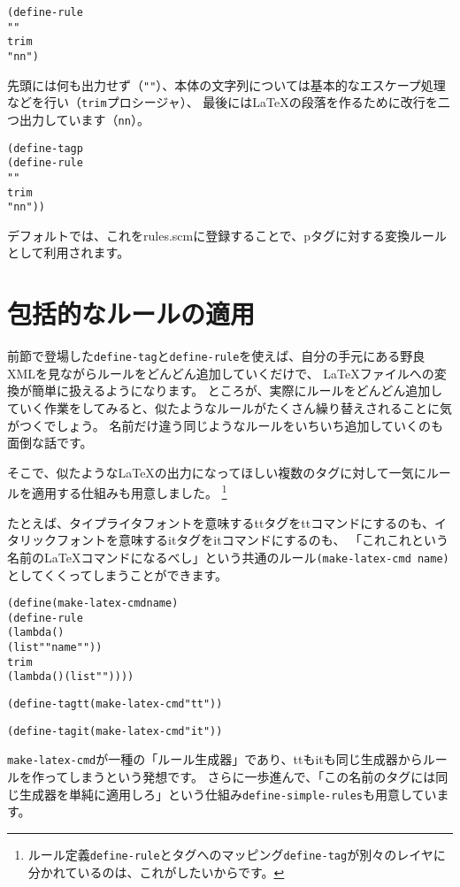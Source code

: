 \documentclass{jsbook}
\begin{document}
\begin{alltt}
(define-rule
  ""
  trim
  "{}n{}n")
\end{alltt}
先頭には何も出力せず（\texttt{""}）、本体の文字列については基本的なエスケープ処理などを行い（\texttt{trim}プロシージャ）、
最後にはLaTeXの段落を作るために改行を二つ出力しています（\texttt{{}n{}n}）。


\begin{alltt}
(define-tag p
  (define-rule
    ""
    trim
    "{}n{}n"))
\end{alltt}
デフォルトでは、これをrules.scmに登録することで、pタグに対する変換ルールとして利用されます。


\section{
包括的なルールの適用
}
前節で登場した\texttt{define-tag}と\texttt{define-rule}を使えば、自分の手元にある野良XMLを見ながらルールをどんどん追加していくだけで、
LaTeXファイルへの変換が簡単に扱えるようになります。
ところが、実際にルールをどんどん追加していく作業をしてみると、似たようなルールがたくさん繰り替えされることに気がつくでしょう。
名前だけ違う同じようなルールをいちいち追加していくのも面倒な話です。



そこで、似たようなLaTeXの出力になってほしい複数のタグに対して一気にルールを適用する仕組みも用意しました。
\footnote{ルール定義\texttt{define-rule}とタグへのマッピング\texttt{define-tag}が別々のレイヤに分かれているのは、これがしたいからです。}


たとえば、タイプライタフォントを意味する{}tt{}タグを{}ttコマンドにするのも、イタリックフォントを意味する{}it{}タグを{}itコマンドにするのも、
「これこれという名前のLaTeXコマンドになるべし」という共通のルール\texttt{(make-latex-cmd name)}としてくくってしまうことができます。


\begin{alltt}
(define (make-latex-cmd name)
  (define-rule
    (lambda ()
      (list "{}{}" name "{}"))
    trim
    (lambda () (list "{}"))))

(define-tag tt (make-latex-cmd "tt"))

(define-tag it (make-latex-cmd "it"))
\end{alltt}\texttt{make-latex-cmd}が一種の「ルール生成器」であり、ttもitも同じ生成器からルールを作ってしまうという発想です。
さらに一歩進んで、「この名前のタグには同じ生成器を単純に適用しろ」という仕組み\texttt{define-simple-rules}も用意しています。
\end{document}
